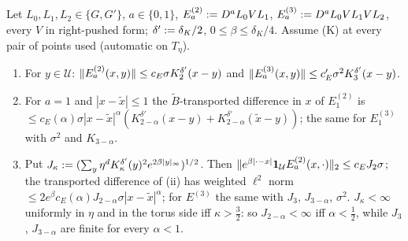 \begin{lemma}\label{sup1:lem:S13}
Let $L_0,L_1,L_2\in\{G,G'\}$, $a\in\{0,1\}$, $E^{(2)}_a:= D^aL_0VL_1$, $E^{(3)}_a:= D^aL_0VL_1VL_2$, every $V$ in right-pushed form; $\delta':=\delta_K/2$, $0\le\beta\le\delta_K/4$. Assume (K) at every pair of points used (automatic on $T_\eta$).
\begin{enumerate}[label=\textup{(\roman*)},nosep,leftmargin=*]
\item For $y\in\mathcal U$: $\lVert E^{(2)}_a(x,y)\rVert\le c_E\sigma K^{\delta'}_2(x-y)$ and $\lVert E^{(3)}_a(x,y)\rVert\le c_E'\sigma^2K^{\delta'}_3(x-y)$.
\item For $a=1$ and $|x-\tilde x|\le1$ the $\tilde B$-transported difference in $x$ of $E^{(2)}_1$ is $\le c_E(\alpha)\sigma|x-\tilde x|^\alpha(K^{\delta'}_{2-\alpha}(x-y)+K^{\delta'}_{2-\alpha}(\tilde x-y))$; the same for $E^{(3)}_1$ with $\sigma^2$ and $K_{3-\alpha}$.
\item Put $J_\kappa:=(\sum_y\eta^dK^{\delta'}_\kappa(y)^2e^{2\beta|y|_\infty})^{1/2}$. Then $\lVert e^{\beta|\cdot-x|}\mathbf 1_{\mathcal U}E^{(2)}_a(x,\cdot)\rVert_2\le c_EJ_2\sigma$; the transported difference of (ii) has weighted $\ell^2$ norm $\le2e^\beta c_E(\alpha)J_{2-\alpha}\sigma|x-\tilde x|^\alpha$; for $E^{(3)}$ the same with $J_3$, $J_{3-\alpha}$, $\sigma^2$. $J_\kappa<\infty$ uniformly in $\eta$ and in the torus side iff $\kappa>\frac32$: so $J_{2-\alpha}<\infty$ iff $\alpha<\frac12$, while $J_3$, $J_{3-\alpha}$ are finite for every $\alpha<1$.
\end{enumerate}
\end{lemma}

